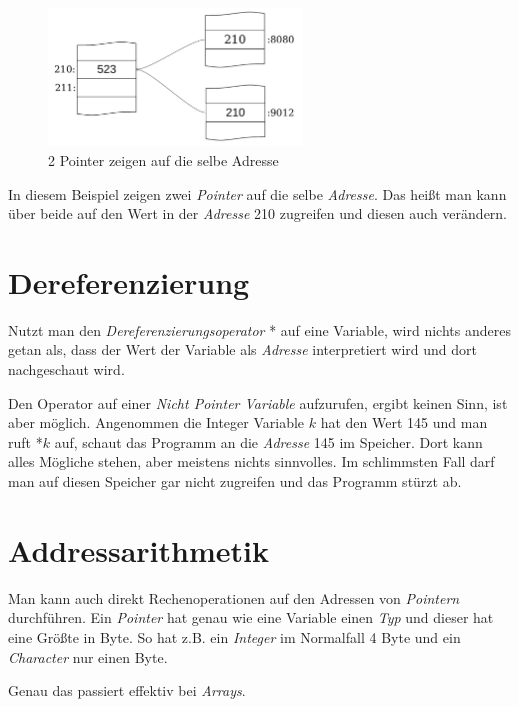 \documentclass[c_worksheet.tex]{subfiles}
\begin{document}
\begin{figure}[h]
\centering
\includegraphics[width=0.6\textwidth]{Grafiken/Pointer/2pointer}
\caption{2 Pointer zeigen auf die selbe Adresse} 
\end{figure}

In diesem Beispiel zeigen zwei \emph{Pointer} auf die selbe \emph{Adresse}. Das heißt man kann über beide auf den Wert in der \emph{Adresse} 210 zugreifen und diesen auch verändern.

 



\section{Dereferenzierung}

Nutzt man den \emph{Dereferenzierungsoperator} * auf eine Variable, wird nichts anderes getan als, dass der Wert der Variable als \emph{Adresse} interpretiert wird und dort nachgeschaut wird. 

Den Operator auf einer \emph{Nicht Pointer Variable} aufzurufen, ergibt keinen Sinn, ist aber möglich. Angenommen die Integer Variable \(k\) hat den Wert 145 und man ruft *\(k\) auf, schaut das Programm an die \emph{Adresse} 145 im Speicher. Dort kann alles Mögliche stehen, aber meistens nichts sinnvolles. Im schlimmsten Fall darf man auf diesen Speicher gar nicht zugreifen und das Programm stürzt ab.



\section{Addressarithmetik}

Man kann auch direkt Rechenoperationen auf den Adressen von \emph{Pointern} durchführen. Ein \emph{Pointer} hat genau wie eine Variable einen \emph{Typ} und dieser hat eine Größte in Byte. So hat z.B. ein \emph{Integer} im Normalfall 4 Byte und ein \emph{Character} nur einen Byte.

 

Genau das passiert effektiv bei \emph{Arrays}.
\end{document}
